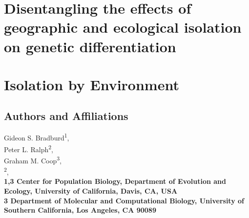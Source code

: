 \chapter{Disentangling the effects of geographic and ecological isolation on genetic differentiation}

\chapter{Isolation by Environment}
\section*{Authors and Affiliations}
\begin{flushleft}
Gideon S. Bradburd\textsuperscript{1},\\
Peter L. Ralph\textsuperscript{2},\\
Graham M. Coop\textsuperscript{3},\\
\textsuperscript{2},\\
\bf{1,3} Center for Population Biology, Department of Evolution and Ecology, University of California, Davis, CA, USA
\\
\bf{3} Department of Molecular and Computational Biology, University of Southern California, Los Angeles, CA 90089\\
\end{flushleft}


\newcommand{\Exp}{\mathop{\mbox{Exp}}}
\newcommand{\cov}{\mathop{\mbox{Cov}}}
\newcommand{\var}{\mathop{\mbox{Var}}}




%

